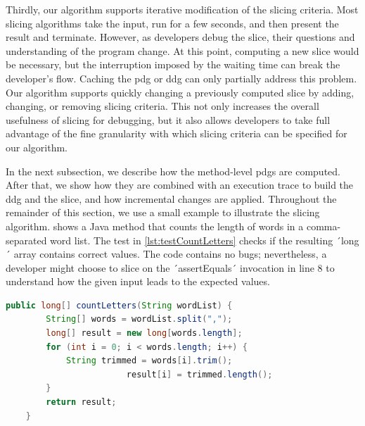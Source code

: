 Thirdly, our algorithm supports iterative modification of the slicing criteria.
Most slicing algorithms take the input, run for a few seconds, and then present the result and terminate.
However, as developers debug the slice, their questions and understanding of the program change.
At this point, computing a new slice would be necessary, but the interruption imposed by the waiting time can break the developer's flow.
Caching the \ac{pdg} or \ac{ddg} can only partially address this problem.
Our algorithm supports quickly changing a previously computed slice by adding, changing, or removing slicing criteria.
This not only increases the overall usefulness of slicing for debugging, but it also allows developers to take full advantage of the fine granularity with which slicing criteria can be specified for our algorithm.

%

In the next subsection, we describe how the method-level \acp{pdg} are computed.
After that, we show how they are combined with an execution trace to build the \ac{ddg} and the slice, and how incremental changes are applied.
Throughout the remainder of this section, we use a small example to illustrate the slicing algorithm.
 shows a Java method that counts the length of words in a comma-separated word list.
The test in \cref{lst:testCountLetters} checks if the resulting ´long´ array contains correct values.
The code contains no bugs; nevertheless, a developer might choose to slice on the ´assertEquals´ invocation in line 8 to understand how the given input leads to the expected values.

\begin{lstlisting}[float,caption={A method to count letters in a word list.},stepnumber=2,numberfirstline=false,label=lst:countLetters,language=Java]
    public long[] countLetters(String wordList) {
        String[] words = wordList.split(",");
        long[] result = new long[words.length];
        for (int i = 0; i < words.length; i++) {
            String trimmed = words[i].trim();
						result[i] = trimmed.length();
        }
        return result;
    }
\end{lstlisting}

